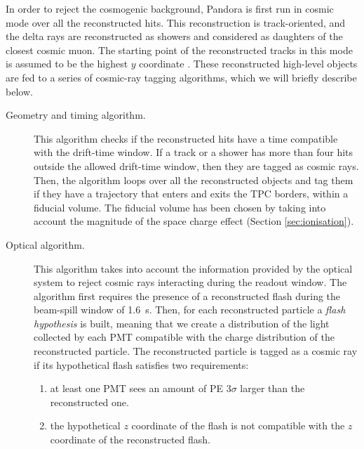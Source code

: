 In order to reject the cosmogenic background, Pandora is first run in cosmic mode over all the reconstructed hits. This reconstruction is track-oriented, and the delta rays are reconstructed as showers and considered as daughters of the closest cosmic muon. The starting point of the reconstructed tracks in this mode is assumed to be the highest $y$ coordinate \cite{Acciarri:2017hat}.
These reconstructed high-level objects are fed to a series of cosmic-ray tagging algorithms, which we will briefly describe below.
\begin{description}
\item[Geometry and timing algorithm.] This algorithm checks if the reconstructed hits have a time compatible with the drift-time window. If a track or a shower has more than four hits outside the allowed drift-time window, then they are tagged as cosmic rays. Then, the algorithm loops over all the reconstructed objects and tag them if they have a trajectory that enters and exits the TPC borders, within a fiducial volume. The fiducial volume has been chosen by taking into account the magnitude of the space charge effect (Section \ref{sec:ionisation}).
\item[Optical algorithm.]{This algorithm takes into account the information provided by the optical system to reject cosmic rays interacting during the readout window. The algorithm first requires the presence of a reconstructed flash during the beam-spill window of 1.6~\si{\micro}s. Then, for each reconstructed particle a \emph{flash hypothesis} is built, meaning that we create a distribution of the light collected by each PMT compatible with the charge distribution of the reconstructed particle. The reconstructed particle is tagged as a cosmic ray if its hypothetical flash satisfies two requirements:
\begin{enumerate}
    \item at least one PMT sees an amount of PE $3\sigma$ larger than the reconstructed one.
    \item the hypothetical $z$ coordinate of the flash is not compatible with the $z$ coordinate of the reconstructed flash.
\end{enumerate}}


\end{description}
